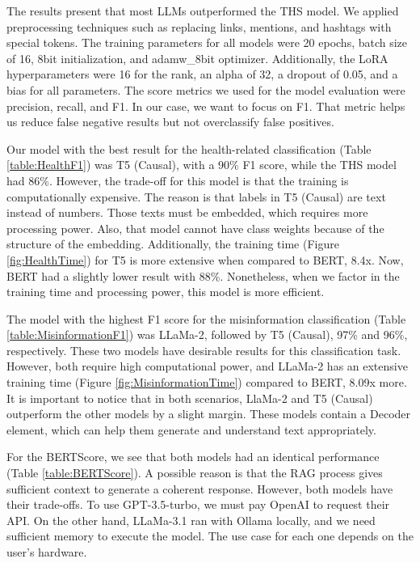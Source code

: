 The results present that most LLMs outperformed the THS model. We applied preprocessing techniques such as replacing links, mentions, and hashtags with special tokens. The training
parameters for all models were 20 epochs, batch size of 16, 8bit initialization, and adamw\_8bit optimizer. Additionally, the LoRA hyperparameters were 16 for the rank, an alpha of 32, a dropout
of 0.05, and a bias for all parameters. The score metrics we used for the model evaluation were precision, recall, and F1. In our case, we want to focus on F1. That metric helps us reduce false
negative results but not overclassify false positives.

Our model with the best result for the health-related classification (Table \ref{table:HealthF1}) was T5 (Causal), with a 90\% F1 score, while the THS model had 86\%. However, the trade-off
for this model is that the training is computationally expensive. The reason is that labels in T5 (Causal) are text instead of numbers. Those texts must be embedded, which requires more
processing power. Also, that model cannot have class weights because of the structure of the embedding. Additionally, the training time  (Figure \ref{fig:HealthTime}) for T5 is more extensive
when compared to BERT, 8.4x. Now, BERT had a slightly lower result with 88\%. Nonetheless, when we factor in the training time and processing power, this model is more efficient.

The model with the highest F1 score for the misinformation classification (Table \ref{table:MisinformationF1}) was LLaMa-2, followed by T5 (Causal), 97\% and 96\%, respectively. These two models
have desirable results for this classification task. However, both require high computational power, and LLaMa-2 has an extensive training time (Figure \ref{fig:MisinformationTime}) compared to BERT,
8.09x more. It is important to notice that in both scenarios, LlaMa-2 and T5 (Causal) outperform the other models by a slight margin. These models contain a Decoder element, which can help them
generate and understand text appropriately.

For the BERTScore, we see that both models had an identical performance (Table \ref{table:BERTScore}). A possible reason is that the RAG process gives sufficient context to generate a coherent response. However, both models
have their trade-offs. To use GPT-3.5-turbo, we must pay OpenAI to request their API. On the other hand, LLaMa-3.1 ran with Ollama locally, and we need sufficient memory to execute the model. The
use case for each one depends on the user's hardware.

